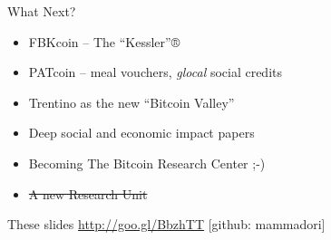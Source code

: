 \documentclass[english,compress]{beamer}
\begin{document}
\begin{frame}{What Next?}
 \begin{itemize}
  \item FBKcoin -- The ``Kessler''®
  \item PATcoin -- meal vouchers, \emph{glocal} social credits
  \item Trentino as the new ``Bitcoin Valley''
  \item Deep social and economic impact papers
  \item Becoming The Bitcoin Research Center ;-)
  \item \st{A new Research Unit}
 \end{itemize}
 
  \begin{block}{These slides}
  \url{http://goo.gl/BbzhTT} [github: mammadori]
  \end{block}

\end{frame}
\end{document}
